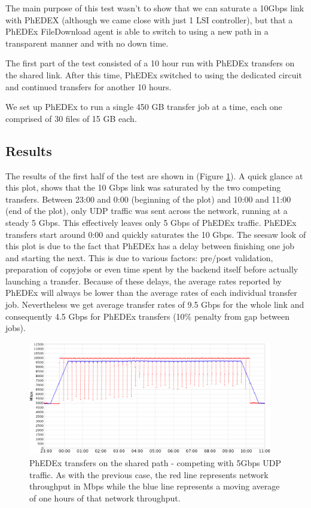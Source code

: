 The main purpose of this test wasn't to show that we can saturate a 10Gbps link with
PhEDEX (although we came close with just 1 LSI controller), but that a PhEDEx FileDownload agent 
is able to switch to using a new path in a transparent manner and with no down time.

The first part of the test consisted of a 10 hour run with PhEDEx transfers on the 
shared link. After this time, PhEDEx switched to using the dedicated circuit and
continued transfers for another 10 hours.

We set up PhEDEx to run a single 450 GB transfer job at a time, each one 
comprised of 30 files of 15 GB each.

\subsection{Results}

The results of the first half of the test are shown in  (Figure \ref{fig:shared_transfers}).
A quick glance at this plot, shows that the 10 Gbps link was saturated by the two
competing transfers. Between 23:00 and 0:00 (beginning of the plot) and 
10:00 and 11:00 (end of the plot), only UDP traffic was sent across the network, 
running at a steady 5 Gbps. This effectively leaves only 5 Gbps of PhEDEx traffic.
PhEDEx transfers start around 0:00 and quickly saturates the 10 Gbps. 
The seesaw look of this plot is due to the fact that PhEDEx has a delay
between finishing one job and starting the next. This is due to various factors:
 pre/post validation, preparation of copyjobs or even time spent by the backend itself 
 before actually launching a transfer. Because of these delays, the average 
 rates reported by PhEDEx will always be lower than the average rates of each
 individual transfer job. Nevertheless we get average transfer rates of 9.5 Gbps for the
 whole link and consequently 4.5 Gbps for PhEDEx transfers (10\% penalty from
 gap between jobs).

\begin{figure}[h]
  \centering
  \includegraphics[width=0.95\textwidth]{Figures/FileDownload_Shared_path.png}
  \caption{PhEDEx transfers on the shared path - competing with 5Gbps UDP traffic. As with
  the previous case, the red line represents network throughput in Mbps while the blue
  line represents a moving average of one hours of that network throughput.}
  \label{fig:shared_transfers}
\end{figure} 

